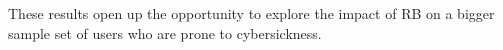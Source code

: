 \documentclass{vgtc}                          %
\begin{document}
These results open up the opportunity to explore the impact of RB on a bigger sample set of users who are prone to cybersickness.






\end{document}
